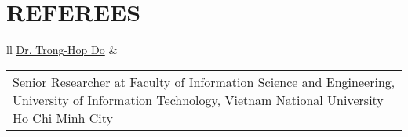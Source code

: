 \section{REFEREES}
\vspace{1mm}
\begin{tabular}{ll}
\href{https://scholar.google.co.kr/citations?user=x4fM0EIAAAAJ&hl=en}{Dr. Trong-Hop Do} & \begin{tabular}[c]{@{}l@{}}  \parbox{15cm}{Senior Researcher at Faculty of Information Science and Engineering, University of Information Technology, Vietnam National University Ho Chi Minh City}\\ hopdt@uit.edu.vn\end{tabular}
\end{tabular}
